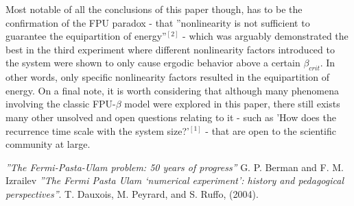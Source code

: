 \documentclass[twocolumn]{article}
\begin{document}
Most notable of all the conclusions of this paper though, has to be the confirmation of the FPU paradox - that ''nonlinearity is not sufficient to guarantee the equipartition of energy''$^{[2]}$ - which was arguably demonstrated the best in the third experiment where different nonlinearity factors introduced to the system were shown to only cause ergodic behavior above a certain $\beta_{crit}$. In other words, only specific nonlinearity factors resulted in the equipartition of energy. On a final note, it is worth considering that although many phenomena involving the classic FPU-$\beta$ model were explored in this paper, there still exists many other unsolved and open questions relating to it - such as 'How does the recurrence time scale with the system size?'$^{[1]}$ - that are open to the scientific community at large. 
\begin{thebibliography}{9}
\textit{''The Fermi-Pasta-Ulam problem: 50 years of progress''}
G. P. Berman and F. M. Izrailev
\textit{''The Fermi Pasta Ulam ‘numerical experiment’: history and pedagogical perspectives''}. 
T. Dauxois, M. Peyrard, and S. Ruffo,
(2004).
\end{thebibliography}
\end{document}
